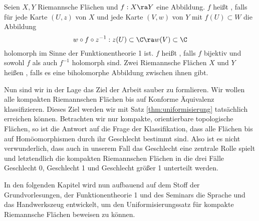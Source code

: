 \begin{defin}
  Seien $X,Y$ Riemannsche Flächen und $f: X \ra Y$ eine Abbildung. $f$
  heißt , falls für jede Karte $(U,z)$ von $X$ und
  jede Karte $(V, w)$ von $Y$ mit $f(U) \subset W$ die Abbildung
  \[
  w \circ f \circ z^{-1} : z(U) \subset \C \ra w(V) \subset \C
  \]
  holomorph im Sinne der Funktionentheorie 1 ist. $f$ heißt
  , falls $f$ bijektiv und sowohl $f$ als auch $f^{-1}$
  holomorph sind. Zwei Riemannsche Flächen $X$ und $Y$ heißen , falls es eine biholomorphe Abbildung zwischen ihnen gibt.
\end{defin}

Nun sind wir in der Lage das Ziel der Arbeit sauber zu
formlieren. Wir wollen alle kompakten Riemannschen Flächen bis auf
Konforme Äquivalenz klassifizieren. Dieses Ziel werden wir mit Satz
\ref{thm:uniformisierung} tatsächlich erreichen können. Betrachten wir
nur kompakte, orientierbare topologische Flächen, so ist die Antwort
auf die Frage der Klassifikation, dass alle Flächen bis auf
Homöomorphismen durch ihr Geschlecht bestimmt sind. Also ist es nicht
verwunderlich, dass auch in unserem Fall das Geschlecht eine zentrale
Rolle spielt und letztendlich die kompakten Riemannschen Flächen in
die drei Fälle Geschlecht 0, Geschlecht 1 und Geschlecht größer 1
unterteilt werden.

In den folgenden Kapitel wird nun aufbauend auf dem Stoff der
Grundvorlesungen, der Funktionentheorie 1 und des Seminars die Sprache
und das Handwerkszeug entwickelt, um den Uniformisierungssatz für
kompakte Riemannsche Flächen beweisen zu können.


